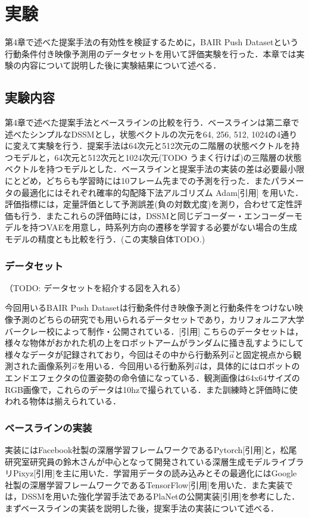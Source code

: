 \chapter{実験}
\label{chap:experiment}
第4章で述べた提案手法の有効性を検証するために，BAIR Push Datasetという行動条件付き映像予測用のデータセットを用いて評価実験を行った．本章では実験の内容について説明した後に実験結果について述べる．

\section{実験内容}
第4章で述べた提案手法とベースラインの比較を行う．ベースラインは第二章で述べたシンプルなDSSMとし，状態ベクトルの次元を64, 256, 512, 1024の4通りに変えて実験を行う．提案手法は64次元と512次元の二階層の状態ベクトルを持つモデルと，64次元と512次元と1024次元(TODO うまく行けば)の三階層の状態ベクトルを持つモデルとした．ベースラインと提案手法の実装の差は必要最小限にとどめ，どちらも学習時には10フレーム先までの予測を行った．またパラメータの最適化にはそれぞれ確率的勾配降下法アルゴリズム Adam[引用] を用いた．
評価指標には，定量評価として予測誤差(負の対数尤度)を測り，合わせて定性評価も行う．またこれらの評価時には，DSSMと同じデコーダー・エンコーダーモデルを持つVAEを用意し，時系列方向の遷移を学習する必要がない場合の生成モデルの精度とも比較を行う．(この実験自体TODO.)

\subsection{データセット}
（TODO: データセットを紹介する図を入れる）

今回用いるBAIR Push Datasetは行動条件付き映像予測と行動条件をつけない映像予測のどちらの研究でも用いられるデータセットであり，カリフォルニア大学バークレー校によって制作・公開されている．[引用]
こちらのデータセットは，様々な物体がおかれた机の上をロボットアームがランダムに掻き乱すようにして様々なデータが記録されており，今回はその中から行動系列$\vec{a}$と固定視点から観測された画像系列$\vec{o}$を用いる．今回用いる行動系列$\vec{a}$は，具体的にはロボットのエンドエフェクタの位置姿勢の命令値になっている．観測画像は64x64サイズのRGB画像で，これらのデータは10hzで撮られている．また訓練時と評価時に使われる物体は揃えられている．

\subsection{ベースラインの実装}
実装にはFacebook社製の深層学習フレームワークであるPytorch[引用]と，松尾研究室研究員の鈴木さんが中心となって開発されている深層生成モデルライブラリPixyz[引用]を主に用いた．学習用データの読み込みとその最適化にはGoogle社製の深層学習フレームワークであるTensorFlow[引用]を用いた．また実装では，DSSMを用いた強化学習手法であるPlaNetの公開実装[引用]を参考にした．
まずベースラインの実装を説明した後，提案手法の実装について述べる．

